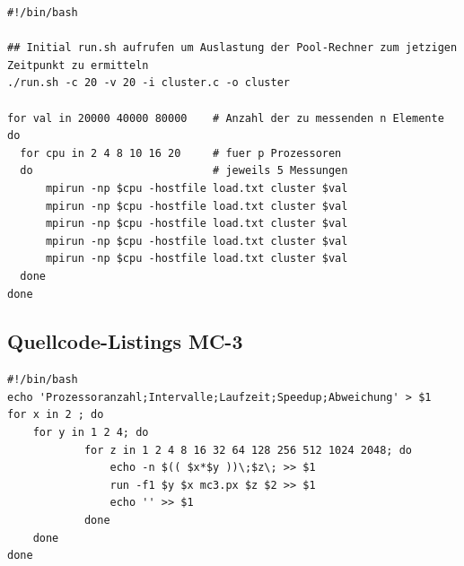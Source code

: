 \documentclass[a4paper,12pt]{scrartcl}
\begin{document}
\begin{lstlisting}[captionpos=b, caption=MPI BASH-Script: bench.sh, label=mpibenchsh]
#!/bin/bash

## Initial run.sh aufrufen um Auslastung der Pool-Rechner zum jetzigen Zeitpunkt zu ermitteln
./run.sh -c 20 -v 20 -i cluster.c -o cluster

for val in 20000 40000 80000	# Anzahl der zu messenden n Elemente
do
  for cpu in 2 4 8 10 16 20		# fuer p Prozessoren
  do							# jeweils 5 Messungen
	  mpirun -np $cpu -hostfile load.txt cluster $val
	  mpirun -np $cpu -hostfile load.txt cluster $val
	  mpirun -np $cpu -hostfile load.txt cluster $val
	  mpirun -np $cpu -hostfile load.txt cluster $val
	  mpirun -np $cpu -hostfile load.txt cluster $val
  done
done
\end{lstlisting}


\subsection{Quellcode-Listings MC-3}
\label{mc3:erfassungsh}
\begin{lstlisting}[captionpos=b, caption=MC-3 BASH-Script: erfassung.sh, label=mc3erfassungsh]
#!/bin/bash
echo 'Prozessoranzahl;Intervalle;Laufzeit;Speedup;Abweichung' > $1
for x in 2 ; do
	for y in 1 2 4; do
			for z in 1 2 4 8 16 32 64 128 256 512 1024 2048; do
				echo -n $(( $x*$y ))\;$z\; >> $1
				run -f1 $y $x mc3.px $z $2 >> $1
				echo '' >> $1
			done
	done
done
\end{lstlisting}

\clearpage
\end{document}

